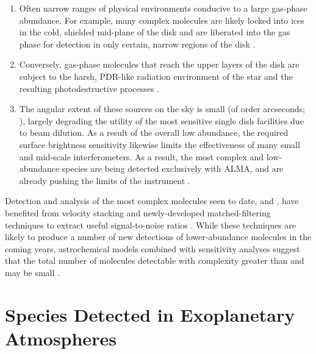 \documentclass[twocolumn]{aastex631}
\begin{document}
\begin{enumerate}
    \item Often narrow ranges of physical environments conducive to a large gas-phase abundance.  For example, many complex molecules are likely locked into ices in the cold, shielded mid-plane of the disk and are liberated into the gas phase for detection in only certain, narrow regions of the disk \citep{Walsh:2014jq}.  
    \item Conversely, gas-phase molecules that reach the upper layers of the disk are subject to the harsh, PDR-like radiation environment of the star and the resulting photodestructive processes \citep{Henning:2010uc}.
    \item The angular extent of these sources on the sky is small (of order arcseconds; \citealt{Brogan:2015cg}), largely degrading the utility of the most sensitive single dish facilities due to beam dilution.  As a result of the overall low abundance, the required surface brightness sensitivity likewise limits the effectiveness of many small and mid-scale interferometers.  As a result, the most complex and low-abundance species are being detected exclusively with ALMA, and are already pushing the limits of the instrument \citep{Loomis:2018bt}.
\end{enumerate}

Detection and analysis of the most complex molecules seen to date,  and  \citep{Walsh:2016bq,Oberg:2015dh}, have benefited from velocity stacking and newly-developed matched-filtering techniques to extract useful signal-to-noise ratios \citep{Loomis:2018bt}.  While these techniques are likely to produce a number of new detections of lower-abundance molecules in the coming years, astrochemical models combined with sensitivity analyses suggest that the total number of molecules detectable with complexity greater than  and  may be small \citep{Walsh:2017nw}.



\section{Species Detected in Exoplanetary Atmospheres}
\label{exoplanets}
\end{document}
